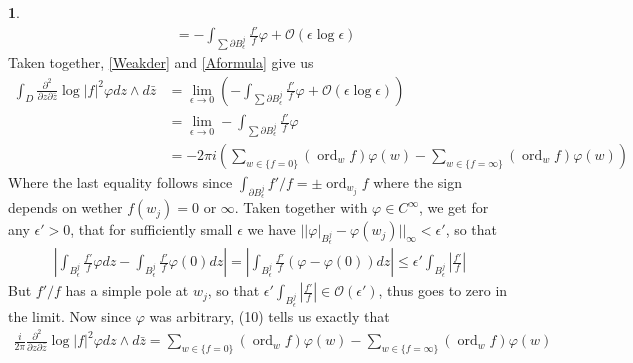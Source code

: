 \documentclass[10.5pt]{article}
\theoremstyle{definition}
\newtheorem{pb}{}
\newcommand{\set}[1]{\{#1\}}
\newcommand{\abs}[1]{\left\vert#1\right\vert}
\newcommand{\norm}[1]{\lvert\lvert#1\rvert\rvert}
\newcommand{\dv}{dz\wedge d\bar{z}}
\newcommand{\pzpz}{\frac{\partial^2}{\partial z \partial \bar{z}}}
\begin{document}
\begin{pb}
\begin{align}
            &= -\int_{\sum \partial B_\epsilon^j} \frac{f'}{f}\varphi + \mathcal{O}(\epsilon \log \epsilon) \label{Aformula}
        \end{align}
        Taken together, \eqref{Weakder} and \eqref{Aformula} give us
        \begin{align}
            \int_D \pzpz \log\abs{f}^2 \varphi \dv &= \lim_{\epsilon \to 0}\left(-\int_{\sum \partial B_\epsilon^j} \frac{f'}{f}\varphi + \mathcal{O}(\epsilon \log \epsilon)\right) \\
            &= \lim_{\epsilon \to 0}-\int_{\sum \partial B_\epsilon^j} \frac{f'}{f}\varphi \\
            &= -2\pi i\left(\sum_{w \in \set{f = 0}} (\operatorname{ord}_wf) \varphi(w) - \sum_{w \in \set{f = \infty}} (\operatorname{ord}_wf) \varphi(w)\right) \label{finalweakderRes}
        \end{align}
        Where the last equality follows since \(\int_{\partial B_\epsilon^j}f'/f = \pm \operatorname{ord}_{w_j}f\) where the sign depends on wether \(f(w_j) = 0\) or \(\infty\). Taken together with \(\varphi \in C^\infty\), we get for any \(\epsilon' > 0\), that for sufficiently small \(\epsilon\) we have \(\norm{\varphi\vert_{B_\epsilon^j} - \varphi(w_j)}_\infty < \epsilon'\), so that
        \begin{align}
            \abs{\int_{B_\epsilon^j} \frac{f'}{f} \varphi dz - \int_{B_\epsilon^j} \frac{f'}{f} \varphi(0)dz} = \abs{\int_{B_\epsilon^j} \frac{f'}{f} (\varphi - \varphi(0)) dz} \leq \epsilon' \int_{B_\epsilon^j} \abs{\frac{f'}{f}}
        \end{align}
        But \(f'/f\) has a simple pole at \(w_j\), so that \(\epsilon' \int_{B_\epsilon^j} \abs{\frac{f'}{f}} \in \mathcal{O}(\epsilon')\), thus goes to zero in the limit. Now since \(\varphi\) was arbitrary, (10) tells us exactly that
        \begin{align}
            \frac{i}{2\pi}\pzpz \log\abs{f}^2 \varphi \dv = \sum_{w \in \set{f = 0}}(\operatorname{ord}_wf) \varphi(w) - \sum_{w \in \set{f = \infty}} (\operatorname{ord}_wf) \varphi(w)
        \end{align}
    \end{pb}
\end{document}
